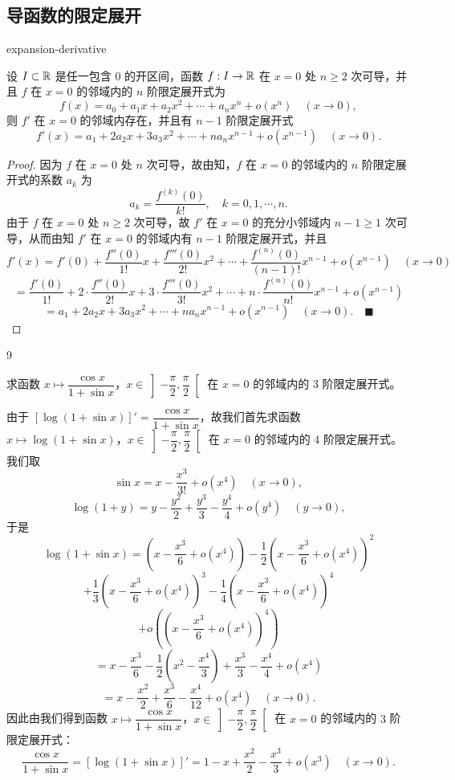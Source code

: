 \subsection{导函数的限定展开}

\begin{mythm}{}{expansion-derivative}

设 $I\subset\mathbb{R}$ 是任一包含 $0$ 的开区间，函数 $f:I\to\mathbb{R}$ 在 $x=0$ 处 $n\geqslant2$ 次可导，并且 $f$ 在 $x=0$ 的邻域内的 $n$ 阶限定展开式为
\[f(x)=a_0+a_1x+a_2x^2+\cdots+a_nx^n+o(x^n)\quad(x\to0),\]
则 $f'$ 在 $x=0$ 的邻域内存在，并且有 $n-1$ 阶限定展开式
\[f'(x)=a_1+2a_2x+3a_3x^2+\cdots+na_nx^{n-1}+o(x^{n-1})\quad(x\to0).\]

\end{mythm}

\begin{proof}

因为 $f$ 在 $x=0$ 处 $n$ 次可导，故由知，$f$ 在 $x=0$ 的邻域内的 $n$ 阶限定展开式的系数 $a_k$ 为
\[a_k=\frac{f^{(k)}(0)}{k!},\quad k=0,1,\cdots,n.\]
由于 $f$ 在 $x=0$ 处 $n\geqslant2$ 次可导，故 $f'$ 在 $x=0$ 的充分小邻域内 $n-1\geqslant1$ 次可导，从而由知 $f'$ 在 $x=0$ 的邻域内有 $n-1$ 阶限定展开式，并且
\[f'(x)=f'(0)+\frac{f''(0)}{1!}x+\frac{f'''(0)}{2!}x^{2}+\cdots+\frac{f^{(n)}(0)}{(n-1)!}x^{n-1}+o(x^{n-1})\quad(x\to0)\]
\[=\frac{f'(0)}{1!}+2\cdot\frac{f''(0)}{2!}x+3\cdot\frac{f'''(0)}{3!}x^{2}+\cdots+n\cdot\frac{f^{(n)}(0)}{n!}x^{n-1}+o(x^{n-1})\]
\[=a_{1}+2a_{2}x+3a_{3}x^{2}+\cdots+na_{n}x^{n-1}+o(x^{n-1})\quad(x\to0).\quad\blacksquare\]

\end{proof}

\begin{sourceexample}{9}

求函数 $x\longmapsto\dfrac{\cos x}{1+\sin x}$，$x\in\left]-\dfrac{\pi}{2},\dfrac{\pi}{2}\right[$ 在 $x=0$ 的邻域内的 $3$ 阶限定展开式。

由于 $[\log(1+\sin x)]'=\dfrac{\cos x}{1+\sin x}$，故我们首先求函数 $x\longmapsto\log(1+\sin x)$，$x\in\left]-\dfrac{\pi}{2},\dfrac{\pi}{2}\right[$ 在 $x=0$ 的邻域内的 $4$ 阶限定展开式。我们取
\[\sin x=x-\frac{x^3}{3!}+o(x^4)\quad(x\to0),\]
\[\log(1+y)=y-\frac{y^2}{2}+\frac{y^3}{3}-\frac{y^4}{4}+o(y^4)\quad(y\to0),\]
于是
\[\log(1+\sin x)=\left(x-\frac{x^3}{6}+o(x^4)\right)-\frac{1}{2}\left(x-\frac{x^3}{6}+o(x^4)\right)^2\]
\[+\frac{1}{3}\left(x-\frac{x^3}{6}+o(x^4)\right)^3-\frac{1}{4}\left(x-\frac{x^3}{6}+o(x^4)\right)^4\]
\[+o\left(\left(x-\frac{x^3}{6}+o(x^4)\right)^4\right)\]
\[=x-\frac{x^3}{6}-\frac{1}{2}\left(x^2-\frac{x^4}{3}\right)+\frac{x^3}{3}-\frac{x^4}{4}+o(x^4)\]
\[=x-\frac{x^2}{2}+\frac{x^3}{6}-\frac{x^4}{12}+o(x^4)\quad(x\to0).\]
因此由我们得到函数 $x\longmapsto\dfrac{\cos x}{1+\sin x}$，$x\in\left]-\dfrac{\pi}{2},\dfrac{\pi}{2}\right[$ 在 $x=0$ 的邻域内的 $3$ 阶限定展开式：
\[\frac{\cos x}{1+\sin x}=[\log(1+\sin x)]'=1-x+\frac{x^2}{2}-\frac{x^3}{3}+o(x^3)\quad(x\to0).\]

\end{sourceexample}

